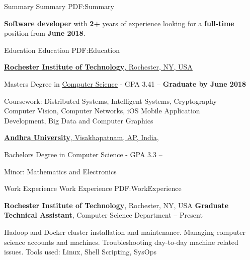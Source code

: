 \documentclass[letterpaper,MMMyyyy,nonstopmode]{simpleresumecv}
\begin{document}
\begin{Body}


\Section
{Summary}
{Summary}
{PDF:Summary}

\Entry
\textbf{Software developer} with \textbf{2+} years of experience looking for a \textbf{full-time} position from \textbf{June 2018}.


\Section
{Education}
{Education}
{PDF:Education}

\Entry
\href{https://www.rit.edu}
{\textbf{Rochester Institute of Technology}, \small{Rochester, NY, USA}}

\Gap
\BulletItem
Masters Degree in
\href{https://cs.rit.edu}
{Computer Science} - GPA 3.41
\hfill
{} --
\textbf{Graduate by June 2018}
\begin{Detail}
\SubBulletItem
Coursework:
Distributed Systems, Intelligent Systems, Cryptography\\Computer Vision, Computer Networks, iOS Mobile Application \\Development, Big Data and Computer Graphics
\end{Detail}



\BigGap
\Entry
\href{http://www.andhrauniversity.edu.in}
{\textbf{Andhra University}, \small{Visakhapatnam, AP, India}},

\Gap
\BulletItem
Bachelors Degree in Computer Science - GPA 3.3
\hfill
{} --
\begin{Detail}
\SubBulletItem
Minor:
Mathematics and Electronics
\end{Detail}


\Section
{Work Experience}
{Work Experience}
{PDF:WorkExperience}

\Entry
{\textbf{Rochester Institute of Technology}, \small{Rochester, NY, USA}}
\Gap
\BulletItem
\textbf{Graduate Technical Assistant}, Computer Science Department
\hfill
{} --
Present
\begin{Detail}
\SubBulletItem
Hadoop and Docker cluster installation and maintenance.
\SubBulletItem
Managing computer science accounts and machines.
\SubBulletItem
Troubleshooting day-to-day machine related issues.
\SubBulletItem
Tools used: Linux, Shell Scripting, SysOps
\end{Detail}


\end{Body}
\end{document}
